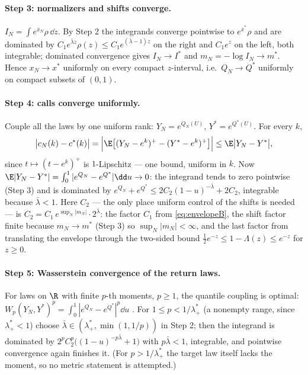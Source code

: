 \paragraph{Step 3: normalizers and shifts converge.}
$I_N=\int e^{\bar{x}_N}\rho\,\dd z$.  By Step 2 the integrands converge
pointwise to $e^{\bar{x}^{\ast}}\rho$ and are dominated by
$C_1e^{\bar\lambda z}\rho(z)\le C_1e^{(\bar\lambda-1)z}$ on the right and
$C_1e^{z}$ on the left, both integrable; dominated convergence gives
$I_N\to I^{\ast}$ and $m_N=-\log I_N\to m^{\ast}$.  Hence
$x_N\to x^{\ast}$ uniformly on every compact $z$-interval, i.e.\
$Q_N\to Q^{\ast}$ uniformly on compact subsets of $(0,1)$.

\paragraph{Step 4: calls converge uniformly.}
Couple all the laws by one uniform rank: $Y_N=e^{Q_N(U)}$,
$Y^{\ast}=e^{Q^{\ast}(U)}$.  For every $k$,
\[
\big|c_N(k)-c^{\ast}(k)\big|
=\Big|\E\big[(Y_N-e^{k})^{+}-(Y^{\ast}-e^{k})^{+}\big]\Big|
\le\E\big|Y_N-Y^{\ast}\big|,
\]
since $t\mapsto(t-e^k)^+$ is $1$-Lipschitz --- one bound, uniform in
$k$.  Now $\E|Y_N-Y^{\ast}|=\int_0^1|e^{Q_N}-e^{Q^{\ast}}|\dd u\to0$: the
integrand tends to zero pointwise (Step 3) and is dominated by
$e^{Q_N}+e^{Q^{\ast}}\le 2C_2(1-u)^{-\bar\lambda}+2C_2$, integrable
because $\bar\lambda<1$.  Here $C_2$ --- the only place uniform control
of the shifts is needed --- is
$C_2=C_1\,e^{\sup_N|m_N|}\cdot2^{\bar\lambda}$: the factor $C_1$ from
\eqref{eq:envelopeB}, the shift factor finite because $m_N\to
m^{\ast}$ (Step 3) so $\sup_N|m_N|<\infty$, and the last factor from
translating the envelope through the two-sided bound
$\tfrac12e^{-z}\le1-\Lambda(z)\le e^{-z}$ for $z\ge0$.

\paragraph{Step 5: Wasserstein convergence of the return laws.}
For laws on $\R$ with finite $p$-th moments, $p\ge1$, the quantile
coupling is optimal:
$W_p(Y_N,Y^{\ast})^{p}=\int_0^1|e^{Q_N}-e^{Q^{\ast}}|^{p}\dd u$
\citep[Ch.~2]{Villani2003}.  For $1\le p<1/\lambda_+^{\ast}$ (a nonempty
range, since $\lambda_+^{\ast}<1$) choose
$\bar\lambda\in(\lambda_+^{\ast},\min(1,1/p))$ in Step 2; then the
integrand is dominated by $2^{p}C_2^{p}\big((1-u)^{-p\bar\lambda}+1\big)$
with $p\bar\lambda<1$, integrable, and pointwise convergence again
finishes it.  (For $p>1/\lambda_+^{\ast}$ the target law itself lacks
the moment, so no metric statement is attempted.)

